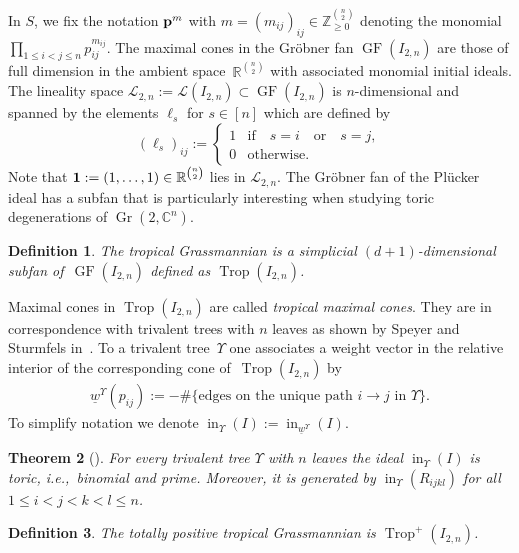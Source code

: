 \documentclass[pdftex]{sigma}%
\newtheorem{Theorem}{Theorem}[section]
\newtheorem{Definition}[Theorem]{Definition}
\numberwithin{equation}{section}
\DeclareMathOperator{\init}{in}
\DeclareMathOperator{\Gr}{Gr}
\DeclareMathOperator{\GF}{GF}
\DeclareMathOperator{\trop}{Trop}
\begin{document}
In $S$, we fix the notation ${\bf p}^m$ with $m=(m_{ij})_{ij}\in \mathbb Z_{\ge 0}^{\binom{n}{2}}$ denoting the monomial $\prod_{1\le i<j\le n} p_{ij}^{m_{ij}}$.
The maximal cones in the Gr\"obner fan $\GF(I_{2,n})$ are those of full dimension in the ambient space~$\mathbb R^{\binom{n}{2}}$ with associated monomial initial ideals.
The lineality space $\mathcal L_{2,n}:=\mathcal L(I_{2,n})\subset \GF(I_{2,n})$ is $n$-dimensional and spanned by the elements $\ell_s$ for $s\in [n]$ which are defined by
\begin{displaymath}
(\ell_s)_{ij}:=\begin{cases}
1& \text{if}\quad s=i\quad \text{or}\quad s=j, \\ 0& \text{otherwise}.
\end{cases}
\end{displaymath}
Note that ${\bf 1}:=(1,\dots,1)\in \mathbb R^{\binom{n}{2}}$ lies in $\mathcal L_{2,n}$.
The Gr\"obner fan of the Pl\"ucker ideal has a subfan that is particularly interesting when studying toric degenerations of $\Gr(2,\mathbb C^n)$.

\begin{Definition}
The {\it tropical Grassmannian} is a simplicial $(d+1)$-dimensional subfan of~$\GF(I_{2,n})$ defined as $\trop(I_{2,n})$.
\end{Definition}

Maximal cones in $\trop(I_{2,n})$ are called {\it tropical maximal cones}. They are in correspondence with trivalent trees with $n$ leaves as shown by Speyer and Sturmfels in~\cite{SS04}.
To a trivalent tree~$\Upsilon$ one associates a weight vector in the relative interior of the corresponding cone of~$\trop(I_{2,n})$ by %
\begin{gather}\label{eq:tree wt}
 \underline{w}^{\Upsilon}(p_{ij}):=-\#\{\text{edges on the unique path } i\to j \text{ in }\Upsilon\}.
\end{gather}
To simplify notation we denote $\init_{\Upsilon}(I):=\init_{\underline{w}^{\Upsilon}}(I)$.

\begin{Theorem}[\cite{SS04}]
For every trivalent tree $\Upsilon$ with $n$ leaves the ideal $\init_{{\Upsilon}}(I)$ is {\it toric}, i.e.,~bino\-mial and prime.
Moreover, it is generated by $\init_{{\Upsilon}}(R_{ijkl})$ for all $1\le i<j<k<l\le n$.
\end{Theorem}


\begin{Definition}
The {\it totally positive tropical} Grassmannian is $\trop^+(I_{2,n})$.
\end{Definition}
\end{document}
